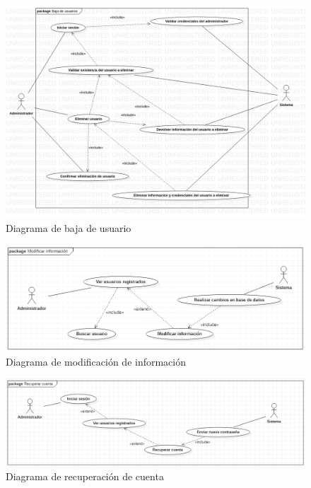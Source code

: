 \documentclass[12pt,letterpaper]{article}
\begin{document}
{\begin{figure}[H]
        \end{figure}
        \begin{figure}[H]
            \centering
            \includegraphics [scale=0.3]{baja_usuarios}
            \caption{Diagrama de baja de usuario}
        \end{figure}
        \begin{figure}[H]
            \centering
            \includegraphics [scale=0.6]{modificarInformacion}
            \caption{Diagrama de modificación de información}
        \end{figure}
        \begin{figure}[H]
            \centering
            \includegraphics [scale=0.5]{recuperarCuenta}
            \caption{Diagrama de recuperación de cuenta}
        \end{figure}
}
\end{document}
